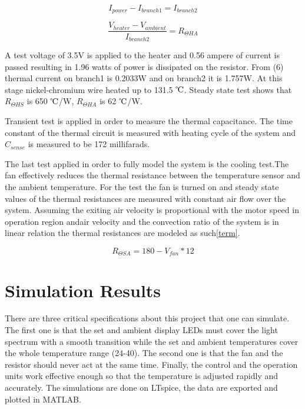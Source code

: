 \documentclass[conference]{IEEEtran}
\begin{document}
\begin{equation}
    I_{power}-I_{branch1}=I_{branch2}
\end{equation}

\begin{equation}
    \frac{V_{heater}-V_{ambient}}{I_{branch2}}=R_{\Theta HA}
\end{equation}

A test voltage of 3.5V is applied to the heater and 0.56 ampere of current is passed resulting in 1.96 watts of power is dissipated on the resistor. From (6) thermal current on branch1 is 0.2033W and on branch2 it is 1.757W. At this stage nickel-chromium wire heated up to 131.5 $\celsius$. Steady state test shows that $R_{\Theta HS}$ is 650 $\celsius$/W, $R_{\Theta HA}$ is 62 $\celsius$/W.

Transient test is applied in order to measure the thermal capacitance. The time constant of the thermal circuit is measured with heating cycle of the system and $C_{sense}$ is measured to be 172 millifarads.

The last test applied in order to fully model the system is the cooling test.The fan effectively reduces the thermal resistance between the temperature sensor and the ambient temperature. For the test the fan is turned on and steady state values of the thermal resistances are measured with constant air flow over the system. Assuming the exiting air velocity is proportional with the motor speed in operation region andair velocity and the convection ratio of the system is in linear relation the thermal resistances are modeled as such\eqref{term}.

\begin{equation}
    R_{\Theta SA}=180-V_{fan}*12
    \label{term}
\end{equation}

\section{Simulation Results}

There are three critical specifications about this project that one can simulate. The first one is that the set and ambient display LEDs must cover the light spectrum with a smooth transition while the set and ambient temperatures cover the whole temperature range (24-40\celsius). The second one is that the fan and the resistor should never act at the same time. Finally, the control and the operation units work effective enough so that the temperature is adjusted rapidly and accurately. The simulations are done on LTspice, the data are exported and plotted in MATLAB. 
\end{document}
